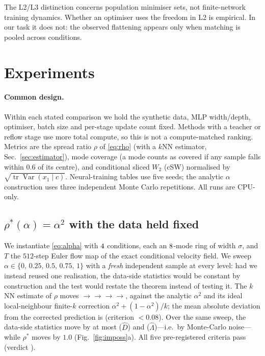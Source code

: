 \documentclass{article}
\theoremstyle{plain}
\newcommand{\cD}{\hat D}
\newcommand{\cL}{\hat\Lambda}
\newcommand{\tr}{\operatorname{tr}}
\newcommand{\Var}{\operatorname{Var}}
\begin{document}
The L2/L3 distinction concerns population minimiser sets, not finite-network training
dynamics. Whether an optimiser uses the freedom in L2 is empirical. In our task it does
not: the observed flattening appears only when matching is pooled across conditions.

\section{Experiments}
\label{sec:exp}

\paragraph{Common design.} Within each stated comparison we hold the synthetic data,
MLP width/depth, optimiser, batch size and per-stage update count fixed. Methods with a
teacher or reflow stage use more total compute, so this is not a compute-matched ranking.
Metrics are the spread ratio $\rho$ of \eqref{eq:rho} (with a $k$NN
estimator, Sec.~\ref{sec:estimator}), mode coverage (a mode counts as covered if any
sample falls within $0.6$ of its centre), and conditional sliced $W_2$ (cSW) normalised
by $\sqrt{\tr\Var(x_1\mid c)}$. Neural-training tables use five seeds; the analytic
$\alpha$ construction uses three independent Monte Carlo repetitions. All runs are CPU-only.

\subsection{\texorpdfstring{$\rho^\ast(\alpha)=\alpha^2$}{rho*(alpha) = alpha squared} with the data held fixed}
\label{sec:exalpha}

We instantiate \eqref{eq:alpha} with $4$ conditions, each an $8$-mode ring of
width $\sigma$, and $T$ the $512$-step Euler flow map of the exact conditional velocity
field. We sweep $\alpha\in\{0,\,0.25,\,0.5,\,0.75,\,1\}$ with a \emph{fresh} independent
sample at every level: had we instead reused one realisation, the data-side statistics
would be constant by construction and the test would restate the theorem instead of
testing it. The $k$NN estimate of $\rho$ moves
\ImpRhoZero{}$\to$\ImpRhoQuarter{}$\to$\ImpRhoHalf{}$\to$\ImpRhoThreeQ{}$\to$\ImpRhoOne{},
against the analytic $\alpha^2$ and its ideal local-neighbour finite-$k$ correction
$\alpha^2+(1-\alpha^2)/k$; the mean absolute deviation from the corrected prediction is
\ImpPredMad{} (criterion $<0.08$). Over the same sweep, the data-side statistics move by
at most \ImpDDev{} ($\cD$) and \ImpLamDev{} ($\cL$)---i.e.\ by Monte-Carlo noise---while
$\rho^\ast$ moves by $1.0$ (Fig.~\ref{fig:imposs}a). All five pre-registered criteria
pass (verdict \ImpVerdict).
\end{document}
